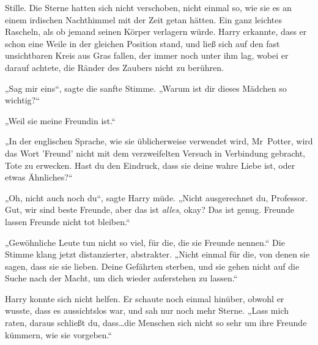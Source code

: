 Stille. Die Sterne hatten sich nicht verschoben, nicht einmal so, wie sie es an einem irdischen Nachthimmel mit der Zeit getan hätten. Ein ganz leichtes Rascheln, als ob jemand seinen Körper verlagern würde. Harry erkannte, dass er schon eine Weile in der gleichen Position stand, und ließ sich auf den fast unsichtbaren Kreis aus Gras fallen, der immer noch unter ihm lag, wobei er darauf achtete, die Ränder des Zaubers nicht zu berühren.

„Sag mir eins“, sagte die sanfte Stimme. „Warum ist dir dieses Mädchen so wichtig?“

„Weil sie meine Freundin ist.“

„In der englischen Sprache, wie sie üblicherweise verwendet wird, Mr~Potter, wird das Wort 'Freund' nicht mit dem verzweifelten Versuch in Verbindung gebracht, Tote zu erwecken. Hast du den Eindruck, dass sie deine wahre Liebe ist, oder etwas Ähnliches?“

„Oh, nicht auch noch du“, sagte Harry müde. „Nicht ausgerechnet du, Professor. Gut, wir sind beste Freunde, aber das ist \emph{alles}, okay? Das ist genug. Freunde lassen Freunde nicht tot bleiben.“

„Gewöhnliche Leute tun nicht so viel, für die, die sie Freunde nennen.“ Die Stimme klang jetzt distanzierter, abstrakter. „Nicht einmal für die, von denen sie sagen, dass sie sie lieben. Deine Gefährten sterben, und sie gehen nicht auf die Suche nach der Macht, um dich wieder auferstehen zu lassen.“

Harry konnte sich nicht helfen. Er schaute noch einmal hinüber, obwohl er wusste, dass es aussichtslos war, und sah nur noch mehr Sterne.
„Lass mich raten, daraus schließt du, dass…die Menschen sich nicht so sehr um ihre Freunde kümmern, wie sie vorgeben.“

